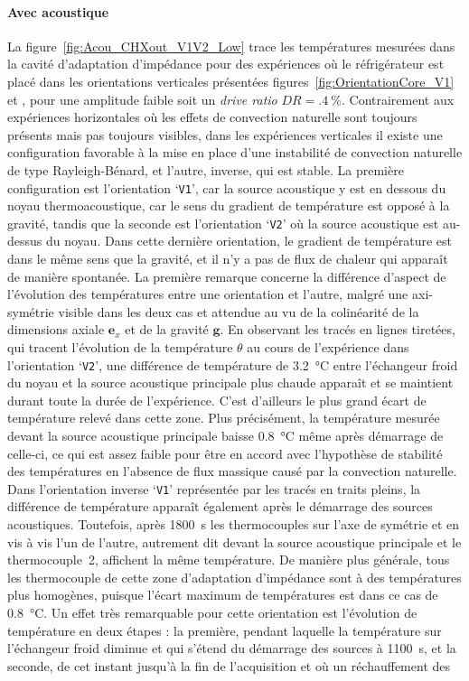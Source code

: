 \paragraph*{Avec acoustique}
La figure~\ref{fig:Acou_CHXout_V1V2_Low} trace les températures mesurées dans la cavité d'adaptation d'impédance pour des expériences où le réfrigérateur est placé dans les orientations verticales présentées figures~\ref{fig:OrientationCore_V1} et , pour une amplitude \og faible \fg{} soit un \textit{drive ratio} $DR=\qty{.4}{\percent}$. Contrairement aux expériences horizontales où les effets de convection naturelle sont toujours présents mais pas toujours visibles, dans les expériences verticales il existe une configuration favorable à la mise en place d'une instabilité de convection naturelle de type Rayleigh-Bénard, et l'autre, inverse, qui est stable. La première configuration est l'orientation `\texttt{V1}', car la source acoustique y est en dessous du noyau thermoacoustique, car le sens du gradient de température est opposé à la gravité, tandis que la seconde est l'orientation `\texttt{V2}' où la source acoustique est au-dessus du noyau. Dans cette dernière orientation, le gradient de température est dans le même sens que la gravité, et il n'y a pas de flux de chaleur qui apparaît de manière spontanée. La première remarque concerne la différence d'aspect de l'évolution des températures entre une orientation et l'autre, malgré une axi-symétrie visible dans les deux cas et attendue au vu de la colinéarité de la dimensions axiale $\mathbf e_x$ et de la gravité $\mathbf g$. En observant les tracés en lignes tiretées, qui tracent l'évolution de la température $\theta$ au cours de l'expérience dans l'orientation `\texttt{V2}', une différence de température de \qty{3.2}{\degreeCelsius} entre l'échangeur froid du noyau et la source acoustique principale plus chaude apparaît et se maintient durant toute la durée de l'expérience. C'est d'ailleurs le plus grand écart de température relevé dans cette zone. Plus précisément, la température mesurée devant la source acoustique principale baisse \qty{.8}{\degreeCelsius} même après démarrage de celle-ci, ce qui est assez faible pour être en accord avec l'hypothèse de stabilité des températures en l'absence de flux massique causé par la convection naturelle. Dans l'orientation inverse `\texttt{V1}' représentée par les tracés en traits pleins, la différence de température apparaît également après le démarrage des sources acoustiques. Toutefois, après \qty{1800}{\second} les thermocouples sur l'axe de symétrie et en vis à vis l'un de l'autre, autrement dit devant la source acoustique principale et le thermocouple~2, affichent la même température. De manière plus générale, tous les thermocouple de cette zone d'adaptation d'impédance sont à des températures plus homogènes, puisque l'écart maximum de températures est dans ce cas de \qty{.8}{\degreeCelsius}. Un effet très remarquable pour cette orientation est l'évolution de température en deux étapes : la première, pendant laquelle la température sur l'échangeur froid diminue et qui s'étend du démarrage des sources à \qty{1100}{\second}, et la seconde, de cet instant jusqu'à la fin de l'acquisition et où un réchauffement des 